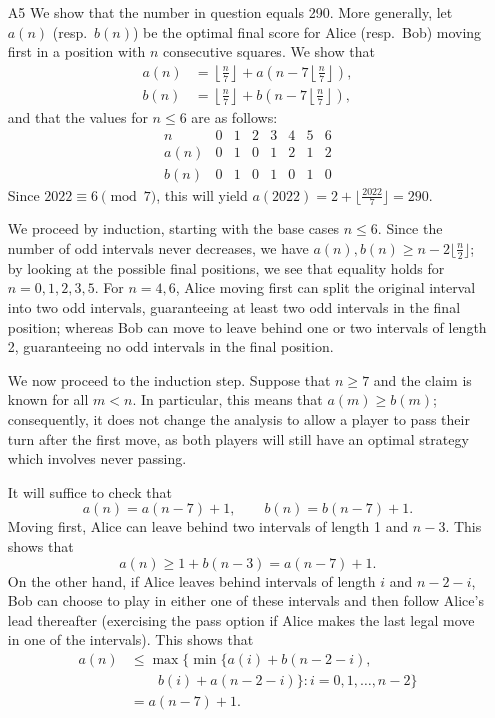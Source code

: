 \documentclass[amssymb,twocolumn,pra,10pt,aps]{revtex4-1}
\begin{document}
\begin{itemize}
\item[A5]
We show that the number in question equals 290. More generally,
let $a(n)$ (resp.\ $b(n)$) be the optimal final score for Alice (resp.\ Bob) moving first in a position with $n$ consecutive squares. We show that
\begin{align*}
a(n) &= \left\lfloor \frac{n}{7} \right\rfloor + a\left(n - 7\left\lfloor \frac{n}{7} \right\rfloor \right), \\
b(n) &= \left\lfloor \frac{n}{7} \right\rfloor + b\left(n - 7\left\lfloor \frac{n}{7} \right\rfloor \right),
\end{align*}
and that the values for $n \leq 6$ are as follows:
\[
\begin{array}{c|cccccccccc}
n & 0 & 1 & 2 & 3 & 4 & 5 & 6 \\
\hline
a(n) & 0 & 1 & 0 & 1 & 2 & 1 & 2  \\
b(n) & 0 & 1 & 0 & 1 & 0 & 1 & 0 
\end{array}
\]
Since $2022 \equiv 6 \pmod{7}$, this will yield
$a(2022) = 2 + \lfloor \frac{2022}{7} \rfloor = 290$.

We proceed by induction, starting with the base cases $n \leq 6$.
Since the number of odd intervals never decreases, we have $a(n), b(n) \geq n - 2 \lfloor \frac{n}{2} \rfloor$; by looking at the possible final positions, we see that equality holds for $n=0,1,2,3,5$. For $n=4,6$, Alice moving first can split the original interval into two odd intervals, guaranteeing at least two odd intervals in the final position; whereas Bob can move to leave behind one or two intervals of length 2, guaranteeing no odd intervals in the final position.

We now proceed to the induction step. Suppose that $n \geq 7$
and the claim is known for all $m < n$. In particular, this means that $a(m) \geq b(m)$; consequently, it does not change the analysis to allow a player to pass their turn after the first move, as both players will still have an optimal strategy which involves never passing.

It will suffice to check that
\[
a(n) = a(n-7) + 1, \qquad b(n) = b(n-7) + 1.
\]
Moving first, Alice can leave behind two intervals of length 1 and $n-3$. This shows that
\[
a(n) \geq 1 + b(n-3) = a(n-7) + 1.
\]
On the other hand, if Alice leaves behind intervals of length $i$ and $n-2-i$, Bob can choose to play in either one of these intervals and then follow Alice's lead thereafter (exercising the pass option if Alice makes the last legal move in one of the intervals). 
This shows that
\begin{align*}
a(n) &\leq \max\{\min\{a(i) + b(n-2-i), \\
& \qquad b(i)+a(n-2-i)\}: i =0,1,\dots,n-2\} \\
&= a(n-7)+1.
\end{align*}


\end{itemize}
\end{document}
